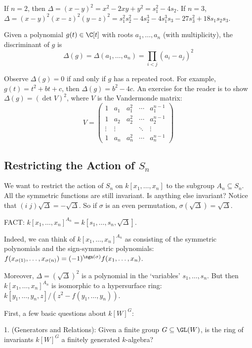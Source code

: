 \begin{ex}
If $n=2$, then $\Delta=(x-y)^2=x^2-2xy+y^2= s_1^2- 4s_2$. If $n=3$, $\Delta=(x - y)^2(x-z)^2(y-z)^2= s_1^2s_2^2- 4s_2^3 - 4s_1^3s_3 - 27 s_3^2+ 18s_1s_2s_3$. 
\end{ex}

Given a polynomial $g(t) \in \C[t]$ with roots $a_1,\ldots,a_n$ (with multiplicity), the discriminant of $g$ is
	\[
	\Delta(g)= \Delta(a_1,\ldots,a_n)= \prod_{i<j} (a_i-a_j)^2
	\]

Observe $\Delta(g)=0$ if and only if $g$ has a repeated root. For example, $g(t)=t^2+bt+c$, then $\Delta(g)= b^2-4c$. An exercise for the reader is to show $\Delta(g)= (\det V)^2$, where $V$ is the Vandermonde matrix:
	\[
	V=
	\begin{pmatrix}
	1 & a_1 & a_1^2 & \cdots & a_1^{n-1} \\
	1 & a_2 & a_2^2 & \cdots & a_2^{n-1} \\
	\vdots & \vdots & & \ddots & \vdots \\
	1 & a_n & a_n^2 & \cdots & a_n^{n-1}
	\end{pmatrix}
	\]




\subsection{Restricting the Action of $S_n$}

We want to restrict the action of $S_n$ on $k[x_1,\ldots,x_n]$ to the subgroup $A_n \subseteq S_n$. All the symmetric functions are still invariant. Is anything else invariant? Notice that $(i\;j)\sqrt{\Delta}= - \sqrt{\Delta}$. So if $\sigma$ is an even permutation, $\sigma(\sqrt{\Delta})= \sqrt{\Delta}$.

FACT: $k[x_1,\ldots,x_n]^{A_n}= k[s_1,\ldots,s_n,\sqrt{\Delta}]$.


Indeed, we can think of $k[x_1,\ldots,x_n]^{A_n}$ as consisting of the symmetric polynomials and the sign-symmetric polynomials: $f(x_{\sigma(1)},\ldots,x_{\sigma(n)})= (-1)^{\sgn(\sigma)} f(x_1,\ldots,x_n)$. 


Moreover, $\Delta= (\sqrt{\Delta})^2$ is a polynomial in the `variables' $s_1,\ldots,s_n$. But then $k[x_1,\ldots,x_n]^{A_n}$ is isomorphic to a hypersurface ring: $k[y_1,\ldots,y_n,z]/(z^2-f(y_1,\ldots,y_n))$. 




First, a few basic questions about $k[W]^G$:

1. (Generators and Relations): Given a finite group $G \subseteq \GL(W)$, is the ring of invariants $k[W]^G$ a finitely generated $k$-algebra? 

